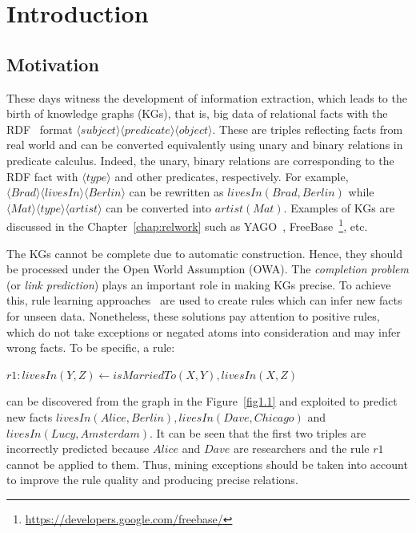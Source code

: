 \chapter{Introduction}
\label{chap:intro}

\section{Motivation}
\label{chap:motivation}

These days witness the development of information extraction, which leads to the birth of knowledge graphs (KGs), that is, big data of relational facts with the RDF~\cite{ref38} format $\langle subject \rangle \langle predicate \rangle \langle object \rangle$. These are triples reflecting facts from real world and can be converted equivalently using unary and binary relations in predicate calculus. Indeed, the unary, binary relations are corresponding to the RDF fact with $\langle type \rangle$ and other predicates, respectively. For example, $\langle Brad \rangle \langle livesIn \rangle \langle Berlin \rangle$ can be rewritten as $livesIn(Brad, Berlin)$ while $\langle Mat \rangle \langle type \rangle \langle artist \rangle$ can be converted into $artist(Mat)$. Examples of KGs are discussed in the Chapter~\ref{chap:relwork} such as  YAGO~\cite{ref28}, FreeBase~\footnote{\url{https://developers.google.com/freebase/}}, etc.

The KGs cannot be complete due to automatic construction. Hence, they should be processed under the Open World Assumption (OWA). The \textit{completion problem} (or \textit{link prediction}) plays an important role in making KGs precise. To achieve this, rule learning approaches~\cite{ref39, ref10} are used to create rules which can infer new facts for unseen data. Nonetheless, these solutions pay attention to positive rules, which do not take exceptions or negated atoms into consideration and may infer wrong facts. To be specific, a rule:

\begin{center}
$r1: livesIn(Y,Z) \leftarrow isMarriedTo(X,Y), livesIn(X,Z)$
\end{center}

can be discovered from the graph in the Figure~\ref{fig1.1} and exploited to predict new facts $livesIn(Alice, Berlin), livesIn(Dave, Chicago)$ and $livesIn(Lucy, Amsterdam)$. It can be seen that the first two triples are incorrectly predicted because $Alice$ and $Dave$ are researchers and the rule $r1$ cannot be applied to them. Thus, mining exceptions should be taken into account to improve the rule quality and producing precise relations.

